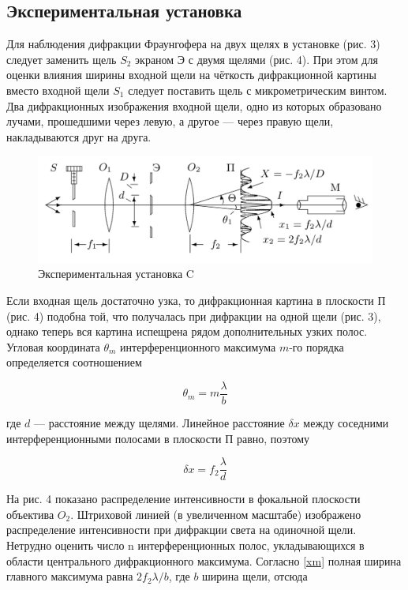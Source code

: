 \subsection{Экспериментальная установка}

Для наблюдения дифракции Фраунгофера на двух щелях в установке (рис. 3) следует заменить щель $ S_2 $ экраном Э с двумя щелями
(рис. 4). При этом для оценки влияния ширины входной щели на чёткость дифракционной картины вместо входной щели $ S_1 $ следует поставить щель с микрометрическим винтом. Два дифракционных изображения входной щели, одно из которых образовано лучами, прошедшими через левую, а другое --- через правую щели, накладываются друг на друга.

	\begin{figure}[h!]
		\centering
		\includegraphics[width=0.8\linewidth]{pics/c.png}
		\caption{Экспериментальная установка C}
		\label{labC}
	\end{figure}

Если входная щель достаточно узка, то дифракционная картина
в плоскости П (рис. 4) подобна той, что получалась при дифракции
на одной щели (рис. 3), однако теперь вся картина испещрена рядом
дополнительных узких полос.
Угловая координата $ \theta_m $ интерференционного максимума $ m $-го порядка определяется соотношением

\begin{equation}\label{}
\theta_m = m \dfrac{\lambda}{b}
\end{equation}

где $ d $ --- расстояние между щелями. Линейное расстояние $ \delta x $ между соседними интерференционными полосами в плоскости П равно, поэтому

\begin{equation}\label{dx}
\delta x = f_2 \dfrac{\lambda}{d}
\end{equation}

На рис. 4 показано распределение интенсивности в фокальной плоскости объектива $ O_2 $. Штриховой линией (в увеличенном масштабе)
изображено распределение интенсивности при дифракции света на одиночной щели. Нетрудно оценить число n интерференционных полос,
укладывающихся в области центрального дифракционного максимума.
Согласно \eqref{xm} полная ширина главного максимума равна $ 2 f_2 \lambda /b $, где $ b $ ширина щели, отсюда

